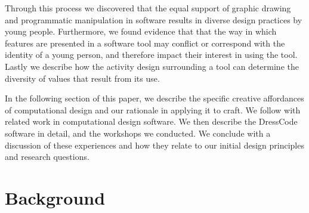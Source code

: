 \documentclass{sigchi}
\begin{document}
Through this process we discovered that the equal support of graphic drawing and programmatic manipulation in software results in diverse design practices by young people. Furthermore, we found evidence that that the way in which features are presented in a software tool may conflict or correspond with the identity of a young person, and therefore impact their interest in using the tool. Lastly we describe how the activity design surrounding a tool can determine the diversity of values that result from its use.

In the following section of this paper, we describe the specific creative affordances of computational design and our rationale in applying it to craft. We follow with related work in computational design software. We then describe the DressCode software in detail, and the workshops we conducted. We conclude with a discussion of these experiences and how they relate to our initial design principles and research questions. 

\section{Background}
\end{document}
